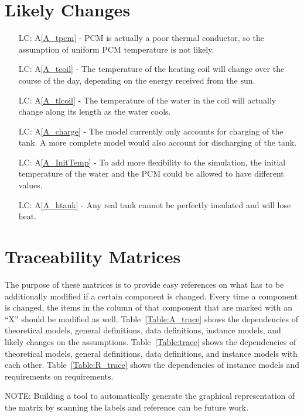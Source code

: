 \documentclass[12pt]{article}
\newcommand{\aref}[1]{A\ref{#1}}
\newcounter{lcnum} %
\begin{document}
\section{Likely Changes}    

\noindent \begin{itemize}

\item[LC\refstepcounter{lcnum}\thelcnum\label{LC_tpcm}:]\aref{A_tpcm} - PCM is
  actually a poor thermal conductor, so the assumption of uniform PCM
  temperature is not likely.

\item[LC\refstepcounter{lcnum}\thelcnum \label{LC_tcoil}:]\aref{A_tcoil} - The
  temperature of the heating coil will change over the course of the day,
  depending on the energy received from the sun.

\item[LC\refstepcounter{lcnum}\thelcnum \label{LC_tlcoil}:]\aref{A_tlcoil} - The
  temperature of the water in the coil will actually change along its length as
  the water cools.

\item[LC\refstepcounter{lcnum}\thelcnum \label{LC_charge}:]\aref{A_charge} - The
  model currently only accounts for charging of the tank.  A more complete model
  would also account for discharging of the tank.

\item[LC\refstepcounter{lcnum}\thelcnum \label{LC_InitTemp}:]\aref{A_InitTemp} - To
  add more flexibility to the simulation, the initial temperature of the water
  and the PCM could be allowed to have different values.

\item[LC\refstepcounter{lcnum}\thelcnum \label{LC_htank}:]\aref{A_htank} - Any
  real tank cannot be perfectly insulated and will lose heat.

\end{itemize}

\section{Traceability Matrices}
The purpose of these matrices is to provide easy references on what has to be 
additionally modified if a certain component is changed.  Every time a 
component is changed, the items in the column of that component that are 
marked with an ``X'' should be modified as well. Table~\ref{Table:A_trace} shows
the dependencies of theoretical models, general definitions, data definitions, 
instance models, and likely changes on the assumptions. Table~\ref{Table:trace}
shows the dependencies of theoretical models, general definitions, data
definitions, and instance models with each other. Table~\ref{Table:R_trace} shows
the dependencies of instance models and requirements on requirements.\par
NOTE: Building a tool to automatically generate the graphical 
representation of the matrix by scanning the labels and reference can be 
future work.
\end{document}
